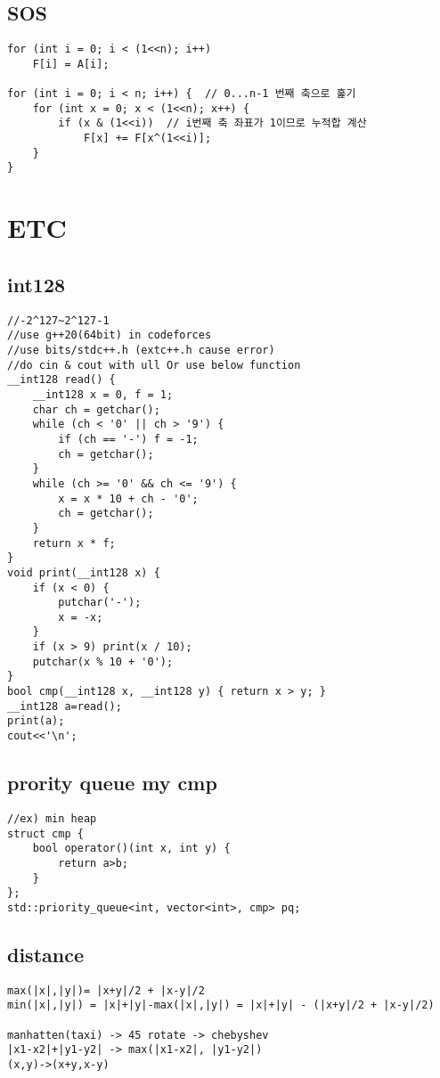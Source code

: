 \documentclass[landscape, 8pt, a4paper, oneside, twocolumn]{extarticle}
\begin{document}
\subsection{SOS}
\begin{verbatim}
for (int i = 0; i < (1<<n); i++)
    F[i] = A[i];

for (int i = 0; i < n; i++) {  // 0...n-1 번째 축으로 훑기
    for (int x = 0; x < (1<<n); x++) {
        if (x & (1<<i))  // i번째 축 좌표가 1이므로 누적합 계산
            F[x] += F[x^(1<<i)];
    }
}
\end{verbatim}
\newpage
\section{ETC}
\subsection{int128}
\begin{verbatim}
//-2^127~2^127-1
//use g++20(64bit) in codeforces
//use bits/stdc++.h (extc++.h cause error)
//do cin & cout with ull Or use below function
__int128 read() {
    __int128 x = 0, f = 1;
    char ch = getchar();
    while (ch < '0' || ch > '9') {
        if (ch == '-') f = -1;
        ch = getchar();
    }
    while (ch >= '0' && ch <= '9') {
        x = x * 10 + ch - '0';
        ch = getchar();
    }
    return x * f;
}
void print(__int128 x) {
    if (x < 0) {
        putchar('-');
        x = -x;
    }
    if (x > 9) print(x / 10);
    putchar(x % 10 + '0');
}
bool cmp(__int128 x, __int128 y) { return x > y; }
__int128 a=read();
print(a);
cout<<'\n';
\end{verbatim}
\newpage
\subsection{prority queue my cmp}
\begin{verbatim}
//ex) min heap
struct cmp {
    bool operator()(int x, int y) {
        return a>b;
    }
};
std::priority_queue<int, vector<int>, cmp> pq;
\end{verbatim}
\vspace{5mm}
\subsection{distance}
\begin{verbatim}
max(|x|,|y|)= |x+y|/2 + |x-y|/2
min(|x|,|y|) = |x|+|y|-max(|x|,|y|) = |x|+|y| - (|x+y|/2 + |x-y|/2)

manhatten(taxi) -> 45 rotate -> chebyshev
|x1-x2|+|y1-y2| -> max(|x1-x2|, |y1-y2|)
(x,y)->(x+y,x-y)
\end{verbatim}
\vspace{5mm}
\end{document}
